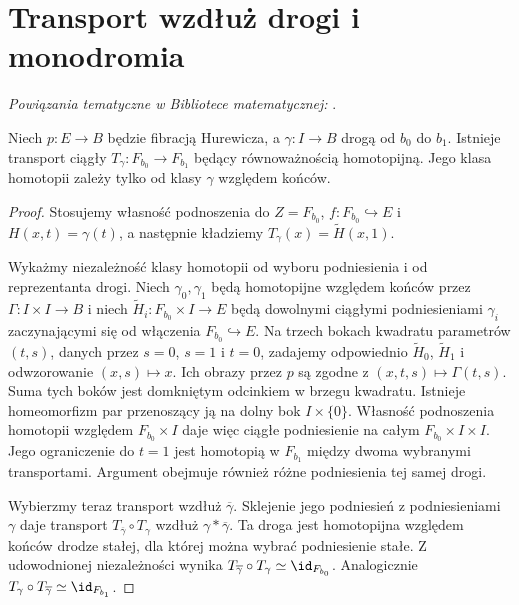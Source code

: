 \section{Transport wzdłuż drogi i monodromia}

\noindent\emph{Powiązania tematyczne w Bibliotece matematycznej:} .

\begin{stwierdzenie}
Niech $p:E\to B$ będzie fibracją Hurewicza, a $\gamma:I\to B$
drogą od $b_0$ do $b_1$. Istnieje transport ciągły
$T_\gamma:F_{b_0}\to F_{b_1}$ będący równoważnością
homotopijną. Jego klasa homotopii zależy tylko od klasy
$\gamma$ względem końców.
\end{stwierdzenie}
\begin{proof}
Stosujemy własność podnoszenia do $Z=F_{b_0}$,
$f:F_{b_0}\hookrightarrow E$ i $H(x,t)=\gamma(t)$, a następnie
kładziemy $T_\gamma(x)=\widetilde H(x,1)$.

Wykażmy niezależność klasy homotopii od wyboru podniesienia
i od reprezentanta drogi. Niech $\gamma_0,\gamma_1$
będą homotopijne względem końców przez
$\Gamma:I\times I\to B$ i niech
$\widetilde H_i:F_{b_0}\times I\to E$ będą dowolnymi
ciągłymi podniesieniami $\gamma_i$ zaczynającymi się
od włączenia $F_{b_0}\hookrightarrow E$.
Na trzech bokach kwadratu parametrów $(t,s)$,
danych przez $s=0$, $s=1$ i $t=0$,
zadajemy odpowiednio $\widetilde H_0$,
$\widetilde H_1$ i odwzorowanie $(x,s)\mapsto x$.
Ich obrazy przez $p$ są zgodne z
$(x,t,s)\mapsto\Gamma(t,s)$.
Suma tych boków jest domkniętym odcinkiem
w brzegu kwadratu. Istnieje homeomorfizm par
przenoszący ją na dolny bok $I\times\{0\}$.
Własność podnoszenia homotopii względem
$F_{b_0}\times I$ daje więc ciągłe
podniesienie na całym $F_{b_0}\times I\times I$.
Jego ograniczenie do $t=1$ jest homotopią
w $F_{b_1}$ między dwoma wybranymi transportami.
Argument obejmuje również różne podniesienia tej samej drogi.

Wybierzmy teraz transport wzdłuż
$\overline\gamma$. Sklejenie jego podniesień
z podniesieniami $\gamma$ daje transport
$T_{\overline\gamma}\circ T_\gamma$
wzdłuż $\gamma*\overline\gamma$.
Ta droga jest homotopijna względem końców
drodze stałej, dla której można wybrać
podniesienie stałe. Z udowodnionej
niezależności wynika
$T_{\overline\gamma}\circ T_\gamma\simeq\id_{F_{b_0}}$.
Analogicznie
$T_\gamma\circ T_{\overline\gamma}\simeq\id_{F_{b_1}}$.
\end{proof}

